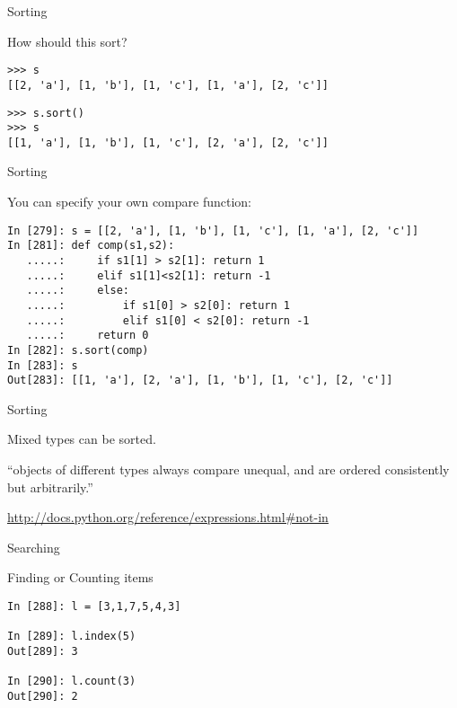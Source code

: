 \documentclass{beamer}
\begin{document}
\begin{frame}[fragile]{Sorting}

{\large How should this sort?}

\begin{verbatim}
>>> s
[[2, 'a'], [1, 'b'], [1, 'c'], [1, 'a'], [2, 'c']]
\end{verbatim}

\pause

\begin{verbatim}
>>> s.sort()
>>> s
[[1, 'a'], [1, 'b'], [1, 'c'], [2, 'a'], [2, 'c']]
\end{verbatim}

\end{frame} 

\begin{frame}[fragile]{Sorting}

{\large You can specify your own compare function:}

\begin{verbatim}
In [279]: s = [[2, 'a'], [1, 'b'], [1, 'c'], [1, 'a'], [2, 'c']]
In [281]: def comp(s1,s2):
   .....:     if s1[1] > s2[1]: return 1
   .....:     elif s1[1]<s2[1]: return -1
   .....:     else:
   .....:         if s1[0] > s2[0]: return 1
   .....:         elif s1[0] < s2[0]: return -1
   .....:     return 0
In [282]: s.sort(comp)
In [283]: s
Out[283]: [[1, 'a'], [2, 'a'], [1, 'b'], [1, 'c'], [2, 'c']]
\end{verbatim}
\end{frame} 

\begin{frame}[fragile]{Sorting}

{\Large
Mixed types can be sorted.
}
\vfill
{\center \Large

``objects of different types always compare unequal, and are ordered
consistently but arbitrarily.''

}

\vfill
\url{http://docs.python.org/reference/expressions.html#not-in}
\end{frame} 

\begin{frame}[fragile]{Searching}

{\Large Finding or Counting items}

\begin{verbatim}
In [288]: l = [3,1,7,5,4,3]

In [289]: l.index(5)
Out[289]: 3

In [290]: l.count(3)
Out[290]: 2
\end{verbatim}

\end{frame} 
\end{document}
